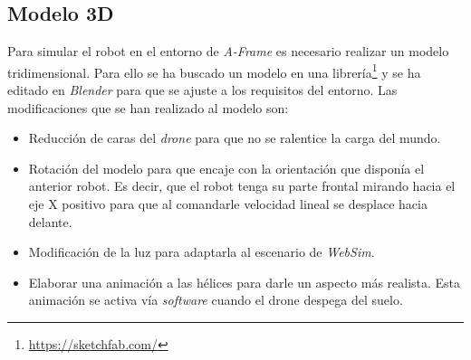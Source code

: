 \subsection{Modelo 3D}

Para simular el robot en el entorno de \textit{A-Frame} es necesario realizar un modelo tridimensional. Para ello se ha buscado un modelo en una librería\footnote{\url{https://sketchfab.com/}} y se ha editado en \textit{Blender} para que se ajuste a los requisitos del entorno. Las modificaciones que se han realizado al modelo son: 
\begin{itemize}
    \item Reducción de caras del \textit{drone} para que no se ralentice la carga del mundo.
    \item Rotación del modelo para que encaje con la orientación que disponía el anterior robot. Es decir, que el robot tenga su parte frontal mirando hacia el eje X positivo para que al comandarle velocidad lineal se desplace hacia delante.
    \item Modificación de la luz para adaptarla al escenario de \textit{WebSim}. 
    
    \item Elaborar una animación a las hélices para darle un aspecto más realista. Esta animación se activa vía \textit{software} cuando el drone despega del suelo. 
\end{itemize}

